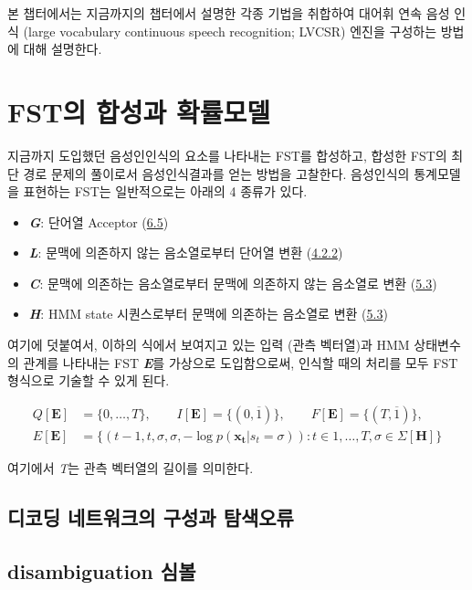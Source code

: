 \documentclass[../main.tex]{subfiles}
\begin{document}
\noindent
본 챕터에서는 지금까지의 챕터에서 설명한 각종 기법을 취합하여 대어휘 연속 음성 인식 (large vocabulary continuous speech recognition; LVCSR) 엔진을 구성하는 방법에 대해 설명한다. 

\section{FST의 합성과 확률모델}
지금까지 도입했던 음성인인식의 요소를 나타내는 FST를 합성하고, 합성한 FST의 최단 경로 문제의 풀이로서 음성인식결과를 얻는 방법을 고찰한다. 음성인식의 통계모델을 표현하는 FST는 일반적으로는 아래의 4 종류가 있다. 

\begin{itemize}
    \item \textbf{\textit{G}}: 단어열 Acceptor (\hyperref[sec:N-gram-FST]{6.5})
    \item \textbf{\textit{L}}: 문맥에 의존하지 않는 음소열로부터 단어열 변환 (\hyperref[subsec:pronunciation-model]{4.2.2})
    \item \textbf{\textit{C}}: 문맥에 의존하는 음소열로부터 문맥에 의존하지 않는 음소열로 변환 (\hyperref[sec:context-dependant-model]{5.3})
    \item \textbf{\textit{H}}: HMM state 시퀀스로부터 문맥에 의존하는 음소열로 변환 (\hyperref[sec:context-dependant-model]{5.3})
\end{itemize}
여기에 덧붙여서, 이하의 식에서 보여지고 있는 입력 (관측 벡터열)과 HMM 상태변수의 관계를 나타내는 FST \textbf{\textit{E}}를 가상으로 도입함으로써, 인식할 때의 처리를 모두 FST 형식으로 기술할 수 있게 된다. 

\begin{equation}\label{eq:7-1}
    \begin{split}
    Q[\bm{E}] &= \{0,\ldots,T\}, \qquad I[\bm{E}] = \{(0,\overline{1})\}, \qquad F[\bm{E}] = \{(T,\overline{1})\}, \\
    E[\bm{E}] &= \{(t-1, t, \sigma, \sigma, -\log p(\mathbf{x_t} | s_t = \sigma)): t \in {1, \ldots, T}, \sigma \in \Sigma[\bm{H}] \}
    \end{split}
\end{equation}

여기에서 \textit{T}는 관측 벡터열의 길이를 의미한다. 

\subsection{디코딩 네트워크의 구성과 탐색오류}
\subsection{disambiguation 심볼}
\end{document}
